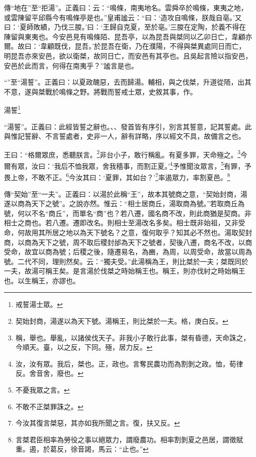 {\noindent\zhuan{}\fzbyks 傳“地在”至“拒湯”。正義曰：云：“鳴條，南夷地名。雲舜卒於鳴條，東夷之地，或雲陳留平邱縣今有鳴條亭是也。”皇甫謐云：“曰：‘造攻自鳴條，朕哉自亳。’又曰：‘夏師敗績，乃伐三朡。’曰：‘王歸自克夏，至於亳。’三朡在定陶，於義不得在陳留與東夷也。今安邑見有鳴條陌、昆吾亭，以為昆吾與桀同以乙卯日亡，韋顧亦爾。故曰：‘韋顧既伐，昆吾。’於昆吾在衛，乃在濮陽，不得與桀異處同日而亡，明昆吾亦來安邑，欲以衛桀，故同日亡，而安邑有其亭也。且吳起言險以指安邑，安邑於此而言，何得在南夷乎？”謐言是也。 \par}

{\noindent\shu{}\fzkt “”至“湯誓”。正義曰：以夏政醜惡，去而歸湯。輔相，與之伐桀，升道從陑，出其不意，遂與桀戰於鳴條之野。將戰而誓戒士眾，史敘其事，作。 \par}

湯誓\footnote{戒誓湯士眾。}

{\noindent\shu{}\fzkt “湯誓”。正義曰：此經皆誓之辭也。、、發首皆有序引，別言其誓意，記其誓處。此與惟記誓辭、不言誓處者，史非一人，辭有詳略，序以經文不具，故備言之也。 \par}

王曰：“格爾眾庶，悉聽朕言。\footnote{契始封商，湯遂以為天下號。湯稱王，則比桀於一夫。格，庚白反。}非台小子，敢行稱亂。有夏多罪，天命殛之。\footnote{稱，舉也。舉亂，以諸侯伐天子。非我小子敢行此事，桀有昏德，天命誅之，今順天。臺，以之反，下同。殛，居力反。}今爾有眾，汝曰：‘我后不恤我眾，舍我穡事，而割正夏。’\footnote{汝，汝有眾。我后，桀也。正，政也。言奪民農功而為割剝之政。恤，荀律反。舍音舍，廢也。}予惟聞汝眾言，\footnote{不憂我眾之言。}有罪，予畏上帝，不敢不正。\footnote{不敢不正桀罪誅之。}今汝其曰：‘夏罪，其如台？’\footnote{今汝其復言桀惡，其亦如我所聞之言。復，扶又反。}率遏眾力，率割夏邑。\footnote{言桀君臣相率為勞役之事以絕眾力，謂廢農功。相率割剝夏之邑居，謂徵賦重。遏，於葛反，徐音謁，馬云：“止也。”}


{\noindent\zhuan{}\fzbyks 傳“契始”至“一夫”。正義曰：以湯於此稱“王”，故本其號商之意，“契始封商，湯遂以商為天下之號”。之說亦然。惟云：“相士居商丘，湯取商為號。”若取商丘為號，何以不名“商丘”，而單名“商”也？若八遷，國名商不改，則此商猶是契商。非相士之商也。若八遷。遷即改名。則相士至湯改名多矣。相士既非始祖，又非受命，何故用其所居之地以為天下號名？之意，復何取乎？知其必不然也。湯取契封商，以商為天下之號，周不取后稷封邰為天下之號者，契後八遷，商名不改，以商受命，故宜以商為號；后稷之後，隨遷易名，為豳，為周，以周受命，故當以周為號。二代不同，理則然矣。云：“獨夫受。”此湯稱為王，則比桀於一夫；桀既同於一夫，故湯可稱王矣。是言湯於伐桀之時始稱王也。稱王，則亦伐紂之時始稱王也。以生稱王，亦謬也。 \par}

